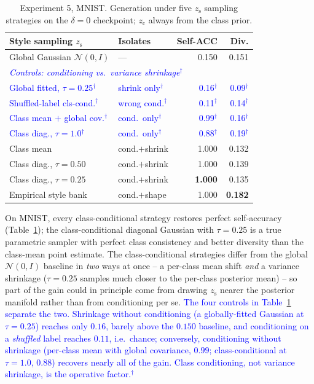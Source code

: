 \documentclass[10pt,letterpaper]{article}
\newcommand{\zc}{z_{\mathrm{c}}}
\newcommand{\zs}{z_{\mathrm{s}}}
\newcommand{\pj}[1]{\textcolor{blue}{#1$^{\dagger}$}}
\begin{document}
\begin{table}[t]
\centering
\small
\caption{Experiment 5, MNIST. Generation under five $\zs$ sampling
         strategies on the $\delta{=}0$ checkpoint; $\zc$ always from the
         class prior.}
\label{tab:sampling}
\begin{tabular}{llrr}
\toprule
Style sampling $\zs$ & Isolates & Self-ACC & Div. \\
\midrule
Global Gaussian $\mathcal N(0,I)$ & --- & 0.150 & 0.151 \\
\midrule
\multicolumn{4}{l}{\emph{\pj{Controls: conditioning vs.\ variance shrinkage}}} \\
\pj{Global fitted, $\tau{=}0.25$} & \pj{shrink only} & \pj{0.16} & \pj{0.09} \\
\pj{Shuffled-label cls-cond.}     & \pj{wrong cond.} & \pj{0.11} & \pj{0.14} \\
\pj{Class mean $+$ global cov.}   & \pj{cond.\ only} & \pj{0.99} & \pj{0.16} \\
\pj{Class diag., $\tau{=}1.0$}    & \pj{cond.\ only} & \pj{0.88} & \pj{0.19} \\
\midrule
Class mean                 & cond.$+$shrink & 1.000 & 0.132 \\
Class diag., $\tau{=}0.50$ & cond.$+$shrink & 1.000 & 0.139 \\
Class diag., $\tau{=}0.25$ & cond.$+$shrink & \textbf{1.000} & 0.135 \\
Empirical style bank       & cond.$+$shape  & 1.000 & \textbf{0.182} \\
\bottomrule
\end{tabular}
\end{table}

On MNIST, every class-conditional strategy restores perfect self-accuracy
(Table~\ref{tab:sampling}); the class-conditional diagonal Gaussian with
$\tau{=}0.25$ is a true parametric sampler with perfect class consistency
and better diversity than the class-mean point estimate. The
class-conditional strategies differ from the global $\mathcal N(0,I)$
baseline in \emph{two} ways at once -- a per-class mean shift \emph{and} a
variance shrinkage ($\tau{=}0.25$ samples much closer to the per-class
posterior mean) -- so part of the gain could in principle come from drawing
$\zs$ nearer the posterior manifold rather than from conditioning per se.
\pj{The four controls in Table~\ref{tab:sampling} separate the two.
Shrinkage without conditioning (a globally-fitted Gaussian at $\tau{=}0.25$)
reaches only $0.16$, barely above the $0.150$ baseline, and conditioning on
a \emph{shuffled} label reaches $0.11$, i.e.\ chance; conversely,
conditioning without shrinkage (per-class mean with global covariance,
$0.99$; class-conditional at $\tau{=}1.0$, $0.88$) recovers nearly all of
the gain. Class conditioning, not variance shrinkage, is the operative
factor.}
\end{document}
